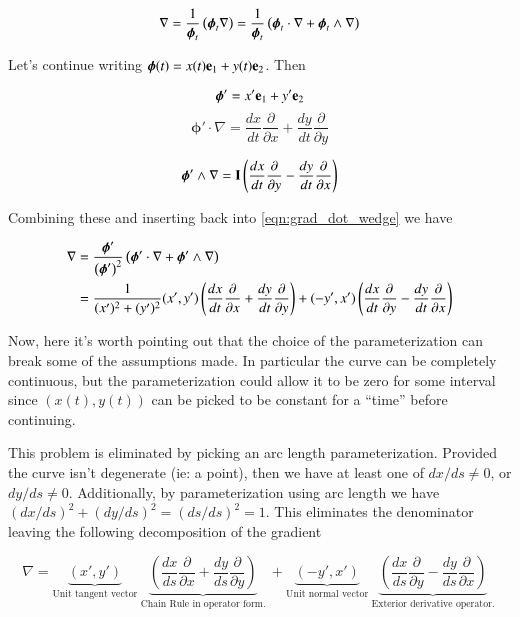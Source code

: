 \documentclass{article}      %
\newcommand{\grad}[0]{\nabla}
\newcommand{\vPhi}[0]{\boldsymbol{\phi}}
\begin{document}
\begin{equation}\label{eqn:grad_dot_wedge}
\grad 
= \inv{\vPhi_t}\left( \vPhi_t \grad \right)
= \inv{\vPhi_t}\left( \vPhi_t \cdot \grad + \vPhi_t \wedge \grad \right)
\end{equation}

Let's continue writing $\vPhi(t) = x(t) \Be_1 + y(t) \Be_2$.  Then

\[
\vPhi' = x' \Be_1 + y' \Be_2
\]
\[
\vPhi' \cdot \grad = 
\frac{dx}{dt} \frac{\partial}{\partial x}
+\frac{dy}{dt} \frac{\partial}{\partial y}
\]

\[
\vPhi' \wedge \grad = 
\BI
\left(\frac{dx}{dt} \frac{\partial}{\partial y} -\frac{dy}{dt} \frac{\partial}{\partial x}\right)
\]

Combining these and inserting back into \ref{eqn:grad_dot_wedge} we have

\begin{align*}
\grad 
&= \frac{\vPhi'}{\left(\vPhi'\right)^2}\left( \vPhi' \cdot \grad + \vPhi' \wedge \grad \right) \\
&=
\inv{(x')^2 + (y')^2}
(x',y')\left(
\frac{dx}{dt} \frac{\partial}{\partial x}
+\frac{dy}{dt} \frac{\partial}{\partial y}
\right)
+
(-y',x')
\left(\frac{dx}{dt} \frac{\partial}{\partial y} -\frac{dy}{dt} \frac{\partial}{\partial x}\right)
\end{align*}

Now, here it's worth pointing out that the choice of the parameterization can break some of the assumptions made.  In particular
the curve can be completely continuous, but the parameterization could allow it to be zero for some interval since $(x(t), y(t))$
can be picked to be constant for a ``time'' before continuing.

This problem is eliminated by picking an arc length parameterization.  Provided the curve isn't degenerate (ie: a point), then
we have at least one of $dx/ds \ne 0$, or $dy/ds \ne 0$.  Additionally, by parameterization using arc length we have
$(dx/ds)^2 + (dy/ds)^2 = (ds/ds)^2 = 1$.  This eliminates the denominator leaving the following decomposition of the  gradient

\begin{equation}
\grad = 
\underbrace{(x',y')}_{\text{Unit tangent vector}}
\underbrace{
\left(
\frac{dx}{ds} \frac{\partial}{\partial x}
+\frac{dy}{ds} \frac{\partial}{\partial y}
\right)
}_{\text{ Chain Rule in operator form. }}
+ 
\underbrace{(-y',x')}_{\text{Unit normal vector}}
\underbrace{
\left(
\frac{dx}{ds} \frac{\partial}{\partial y}
-\frac{dy}{ds} \frac{\partial}{\partial x}
\right)
}_{\text{ Exterior derivative operator. }}
\end{equation}
\end{document}
